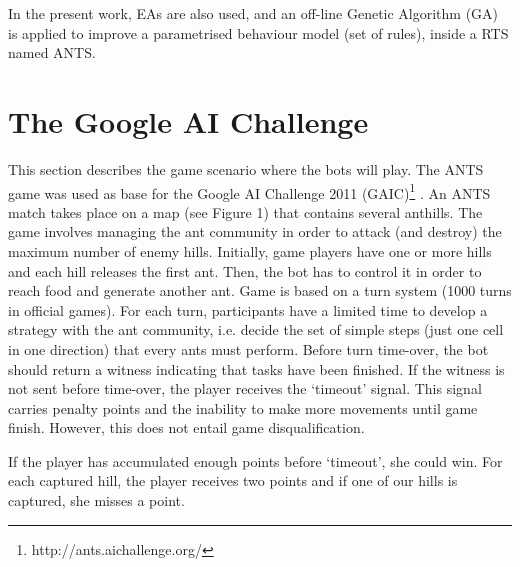 \documentclass[runningheads]{llncs}
\begin{document}

In the present work, EAs are also used, and an off-line Genetic Algorithm (GA) is applied to improve a parametrised behaviour model (set of rules), inside a RTS named ANTS.




\section{The Google AI Challenge}

This section describes the game scenario where the bots will play. The ANTS game was used as base for the Google AI Challenge 2011
 (GAIC)\footnote{http://ants.aichallenge.org/} \cite{holdum2011google}. An ANTS match takes place on a map (see Figure 1) %
that contains several anthills. The game involves managing the ant community in order to attack (and destroy) the maximum number of enemy hills. Initially, game players have one or more hills and each hill releases the first ant. Then, the bot has to control it in order to reach food and generate another ant. Game is based on a turn system (1000 turns in official games). For each turn, participants have a limited time to develop a strategy with the ant community, i.e. decide the set of simple steps (just one cell in one direction) that every ants must perform.
Before turn time-over, the bot should return a witness indicating that tasks have been finished. If the witness is not sent before time-over, the player receives the `timeout' signal. This signal carries penalty points and the inability to make more movements until game finish. However, this does not entail game disqualification. 

If the player has accumulated enough points before `timeout', she could win. For each captured hill, the player receives two points and if one of our hills is captured, she misses a point.


\end{document}
